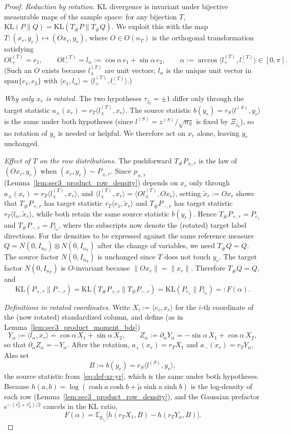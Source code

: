 \documentclass[10pt]{article}
\newcommand{\Ebb}{\mathbb E}
\newcommand{\ip}[2]{\langle #1,#2\rangle}
\newcommand{\KL}{\mathrm{KL}}
\newcommand{\trg}{T}
\newcommand{\nT}{n_{\trg}}
\newcommand{\src}{S}
\newcommand{\nS}{n_{\src}}
\newcommand{\zsrc}{z^{(\src)}}
\begin{document}
\begin{proof}
\textit{Reduction by rotation.}
KL divergence is invariant under bijective measurable maps of the sample
space: for any bijection $T$, $\KL(P\|Q)=\KL(T_\#P\|T_\#Q)$.  We exploit
this with the map $T:(x_r,y_r)\mapsto(Ox_r,y_r)$, where $O\in O(\nT)$ is the
orthogonal transformation satisfying
\[
    Ol^{(\trg)}_+ = e_1, \qquad Ol^{(\trg)}_- = l_\alpha := \cos\alpha\,e_1+\sin\alpha\,e_2,
    \qquad \alpha := \arccos\!\ip{l^{(\trg)}_+}{l^{(\trg)}_-}\in[0,\pi].
\]
(Such an $O$ exists because $l^{(\trg)}_\pm$ are unit vectors; $l_\alpha$ is the
unique unit vector in $\mathrm{span}\{e_1,e_2\}$ with $\ip{e_1}{l_\alpha}=\ip{l^{(\trg)}_+}{l^{(\trg)}_-}$.)

\textit{Why only $x_r$ is rotated.}
The two hypotheses $\tau_{j_0}=\pm1$ differ only through the target statistic
$a_\pm(x_r)=r_T\ip{l^{(\trg)}_\pm}{x_r}$.
The source statistic $b(y_r)=r_S\ip{l^{(\src)}}{y_r}$ is the same under
both hypotheses (since $l^{(\src)}=\zsrc/\sqrt{\nS}$ is fixed by $\Xi_{j_0}$),
so no rotation of $y_r$ is needed or helpful.  We therefore act on
$x_r$ alone, leaving $y_r$ unchanged.

\textit{Effect of $T$ on the row distributions.}
The pushforward $T_\#P_{\pm,r}$ is the law of $(Ox_r,y_r)$ when
$(x_r,y_r)\sim P_{\pm,r}$.  Since $p_{\pm,r}$
(Lemma~\ref{lem:sec3_product_row_density}) depends on $x_r$ only through
$a_\pm(x_r)=r_T\ip{l^{(\trg)}_\pm}{x_r}$, and
$\ip{l^{(\trg)}_\pm}{x_r}=\ip{Ol^{(\trg)}_\pm}{Ox_r}$, setting
$\tilde x_r:=Ox_r$ shows that $T_\#P_{+,r}$ has target statistic
$r_T\ip{e_1}{\tilde x_r}$ and $T_\#P_{-,r}$ has target statistic
$r_T\ip{l_\alpha}{\tilde x_r}$, while both retain the same source statistic
$b(y_r)$.  Hence $T_\#P_{+,r}=P_{e_1}$ and $T_\#P_{-,r}=P_{l_\alpha}$,
where the subscripts now denote the (rotated) target label directions.
For the densities to be expressed against the same reference measure
$Q=N(0,I_{\nT})\otimes N(0,I_{\nS})$ after the change of variables, we
need $T_\#Q=Q$.  The source factor $N(0,I_{\nS})$ is unchanged since $T$
does not touch $y_r$.  The target factor $N(0,I_{\nT})$ is $O$-invariant
because $\|Ox_r\|=\|x_r\|$.  Therefore $T_\#Q=Q$, and
\[
    \KL(P_{+,r}\|P_{-,r})
    =
    \KL(T_\#P_{+,r}\|T_\#P_{-,r})
    =
    \KL(P_{e_1}\|P_{l_\alpha})
    =:
    F(\alpha).
\]

\textit{Definitions in rotated coordinates.}
Write $X_i:=\ip{e_i}{x_r}$ for the $i$-th coordinate of the (now rotated)
standardized column, and define (as in Lemma~\ref{lem:sec3_product_moment_bds})
\[
    Y_\alpha := \ip{l_\alpha}{x_r} = \cos\alpha\,X_1+\sin\alpha\,X_2,
    \qquad
    Z_\alpha := \partial_\alpha Y_\alpha = -\sin\alpha\,X_1+\cos\alpha\,X_2,
\]
so that $\partial_\alpha Z_\alpha=-Y_\alpha$.  After the rotation,
$a_+(x_r)=r_T X_1$ and $a_-(x_r)=r_T Y_\alpha$.  Also set
\[
    B := b(y_r) = r_S\ip{l^{(\src)}}{y_r},
\]
the source statistic from~\eqref{eq:def-xr-yr}, which is the same under
both hypotheses.  Because
$h(a,b)=\log(\cosh a\cosh b+\tilde\mu\sinh a\sinh b)$ is the log-density
of each row (Lemma~\ref{lem:sec3_product_row_density}), and the Gaussian
prefactor $e^{-(r_T^2+r_S^2)/2}$ cancels in the KL ratio,
\[
    F(\alpha)
    =
    \Ebb_{p_{e_1}}\!\bigl[h(r_T X_1,B)-h(r_T Y_\alpha,B)\bigr].
\]


\end{proof}
\end{document}
